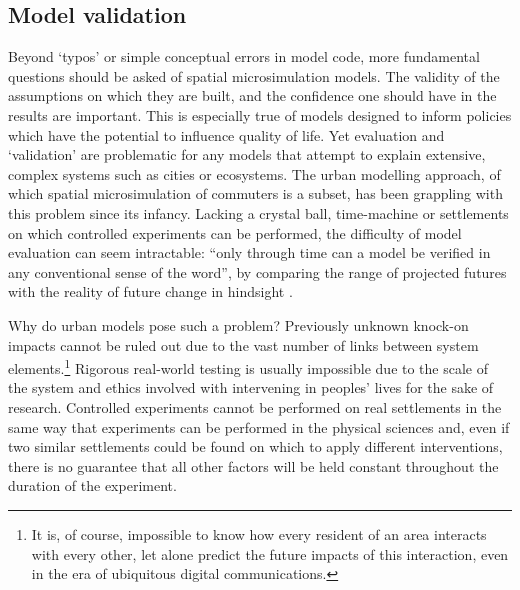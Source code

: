 \documentclass[a4paper, 11pt, twoside]{article}
\begin{document}
\subsection{Model validation}
\label{meval}
Beyond `typos' or simple conceptual errors in model code, more fundamental
questions should be asked of spatial microsimulation models. The validity
of the assumptions on which they are built, and the confidence one should have
in the results are important. This is especially true of models designed to inform
policies which have the potential to influence quality of life. Yet
evaluation and `validation' are
 problematic for any models that attempt to explain extensive, complex
systems such as cities or ecosystems. The urban modelling approach, of which
spatial microsimulation of commuters is a subset, has been grappling with this
problem since its infancy. Lacking a crystal ball, time-machine or settlements
on which controlled experiments can be performed, the difficulty of model evaluation can
seem intractable: ``only through time can a model be verified in any
conventional sense of the word'', by comparing the range of projected futures
with the reality of future change in hindsight \citep[p.~15]{batty1976urban}.

Why do urban models pose such a problem? Previously unknown knock-on impacts
cannot be ruled out due to the vast number of links between system
elements.\footnote{It is, of course, impossible to know how every resident of
an area interacts with every other, let alone predict the future impacts of
this interaction, even in the era of ubiquitous digital communications.
}
Rigorous real-world testing is usually impossible due to the scale of the system
and ethics involved with intervening in peoples' lives for the sake of research.
Controlled experiments cannot be performed on real settlements in the
same way that experiments can be performed in the physical sciences and, even if
two similar settlements could be found on which to apply different
interventions, there is no guarantee that all other factors will be held
constant throughout the duration of the experiment. %
\end{document}
